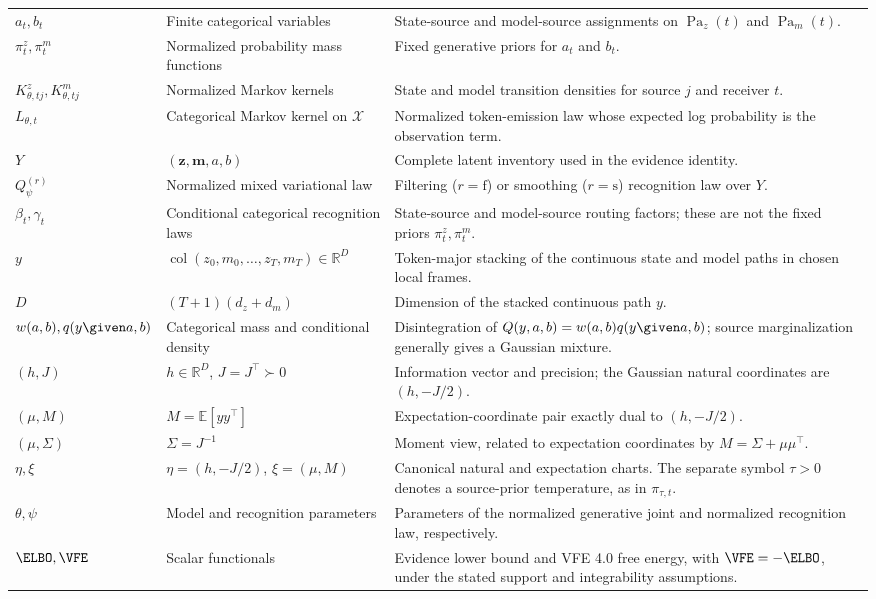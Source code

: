 {\begin{longtable}{>{\raggedright\arraybackslash}p{} >{\raggedright\arraybackslash}p{} >{\raggedright\arraybackslash}p{}}
\addlinespace
$a_t,b_t$ & Finite categorical variables & State-source and model-source assignments on $\operatorname{Pa}_z(t)$ and $\operatorname{Pa}_m(t)$. \\
\addlinespace
$\pi_t^z,\pi_t^m$ & Normalized probability mass functions & Fixed generative priors for $a_t$ and $b_t$. \\
\addlinespace
$K^z_{\theta,tj},K^m_{\theta,tj}$ & Normalized Markov kernels & State and model transition densities for source $j$ and receiver $t$. \\
\addlinespace
$L_{\theta,t}$ & Categorical Markov kernel on $\mathcal X$ & Normalized token-emission law whose expected log probability is the observation term. \\
\addlinespace
$Y$ & $(\boldsymbol z,\boldsymbol m,a,b)$ & Complete latent inventory used in the evidence identity. \\
\addlinespace
$Q_\psi^{(r)}$ & Normalized mixed variational law & Filtering ($r=\mathrm f$) or smoothing ($r=\mathrm s$) recognition law over $Y$. \\
\addlinespace
$\beta_t,\gamma_t$ & Conditional categorical recognition laws & State-source and model-source routing factors; these are not the fixed priors $\pi_t^z,\pi_t^m$. \\
\addlinespace
$y$ & $\operatorname{col}(z_0,m_0,\ldots,z_T,m_T)\in\mathbb R^D$ & Token-major stacking of the continuous state and model paths in chosen local frames. \\
\addlinespace
$D$ & $(T+1)(d_z+d_m)$ & Dimension of the stacked continuous path $y$. \\
\addlinespace
$w(a,b),q(y\given a,b)$ & Categorical mass and conditional density & Disintegration of $Q(y,a,b)=w(a,b)q(y\given a,b)$; source marginalization generally gives a Gaussian mixture. \\
\addlinespace
$(h,J)$ & $h\in\mathbb R^D$, $J=J^\top\succ0$ & Information vector and precision; the Gaussian natural coordinates are $(h,-J/2)$. \\
\addlinespace
$(\mu,M)$ & $M=\mathbb E[yy^\top]$ & Expectation-coordinate pair exactly dual to $(h,-J/2)$. \\
\addlinespace
$(\mu,\Sigma)$ & $\Sigma=J^{-1}$ & Moment view, related to expectation coordinates by $M=\Sigma+\mu\mu^\top$. \\
\addlinespace
$\eta,\xi$ & $\eta=(h,-J/2)$, $\xi=(\mu,M)$ & Canonical natural and expectation charts. The separate symbol $\tau>0$ denotes a source-prior temperature, as in $\pi_{\tau,t}$. \\
\addlinespace
$\theta,\psi$ & Model and recognition parameters & Parameters of the normalized generative joint and normalized recognition law, respectively. \\
\addlinespace
$\ELBO,\VFE$ & Scalar functionals & Evidence lower bound and VFE 4.0 free energy, with $\VFE=-\ELBO$, under the stated support and integrability assumptions. \\
\end{longtable}
}
